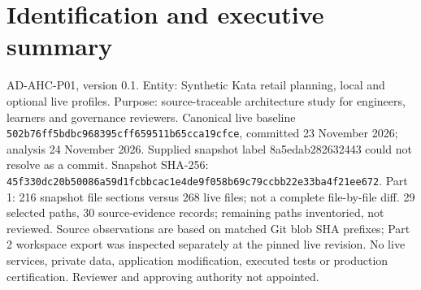 \documentclass[10pt,letterpaper]{article}
\begin{document}
\makedoctitle
\tableofcontents
\listoffigures
\listoftables
\clearpage
\section{Identification and executive summary}
AD-AHC-P01, version 0.1. Entity: Synthetic Kata retail planning, local and optional live profiles. Purpose: source-traceable architecture study for engineers, learners and governance reviewers. Canonical live baseline \nolinkurl{502b76ff5bdbc968395cff659511b65cca19cfce}, committed 23 November 2026; analysis 24 November 2026. Supplied snapshot label 8a5edab282632443 could not resolve as a commit. Snapshot SHA-256: \nolinkurl{45f330dc20b50086a59d1fcbbcac1e4de9f058b69c79ccbb22e33ba4f21ee672}. Part 1: 216 snapshot file sections versus 268 live files; not a complete file-by-file diff. 29 selected paths, 30 source-evidence records; remaining paths inventoried, not reviewed. Source observations are based on matched Git blob SHA prefixes; Part 2 workspace export was inspected separately at the pinned live revision. No live services, private data, application modification, executed tests or production certification. Reviewer and approving authority not appointed.
\end{document}
